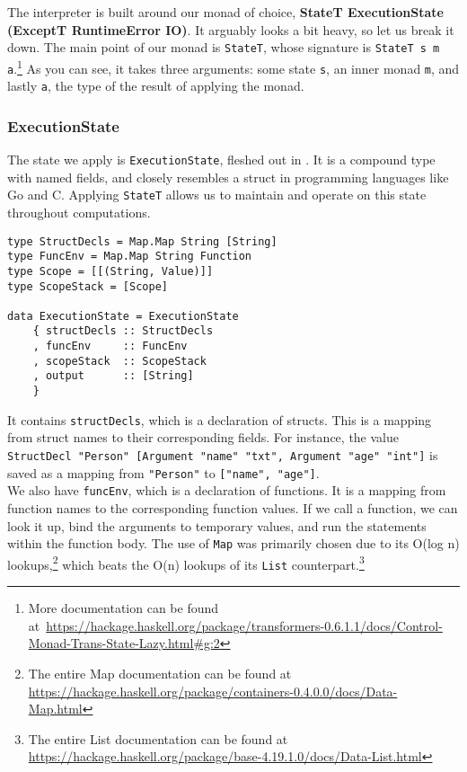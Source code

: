 The interpreter is built around our monad of choice, \textbf{StateT ExecutionState (ExceptT RuntimeError IO)}. It arguably looks a bit heavy, so let us break it down. The main point of our monad is \texttt{StateT}, whose signature is \texttt{StateT s m a}.\footnote{More documentation can be found at~\url{https://hackage.haskell.org/package/transformers-0.6.1.1/docs/Control-Monad-Trans-State-Lazy.html\#g:2}} As you can see, it takes three arguments: some state \texttt{s}, an inner monad \texttt{m}, and lastly \texttt{a}, the type of the result of applying the monad.

\subsubsection{ExecutionState}

The state we apply is \texttt{ExecutionState}, fleshed out in . It is a compound type with named fields, and closely resembles a struct in programming languages like Go and C. Applying \texttt{StateT} allows us to maintain and operate on this state throughout computations. \\

\begin{lstlisting}[caption={The Psnodig interpreter's state.}, captionpos=b, label={psnodigInterpreterState}]
type StructDecls = Map.Map String [String]
type FuncEnv = Map.Map String Function
type Scope = [[(String, Value)]]
type ScopeStack = [Scope]

data ExecutionState = ExecutionState
    { structDecls :: StructDecls
    , funcEnv     :: FuncEnv
    , scopeStack  :: ScopeStack
    , output      :: [String]
    }
\end{lstlisting}

It contains \texttt{structDecls}, which is a declaration of structs. This is a mapping from struct names to their corresponding fields. For instance, the value \texttt{StructDecl "Person" [Argument "name" "txt", Argument "age" "int"]} is saved as a mapping from \texttt{"Person"} to \texttt{["name", "age"]}. \\

We also have \texttt{funcEnv}, which is a declaration of functions. It is a mapping from function names to the corresponding function values. If we call a function, we can look it up, bind the arguments to temporary values, and run the statements within the function body. The use of \texttt{Map} was primarily chosen due to its O(log n) lookups,\footnote{The entire Map documentation can be found at \url{https://hackage.haskell.org/package/containers-0.4.0.0/docs/Data-Map.html}} which beats the O(n) lookups of its \texttt{List} counterpart.\footnote{The entire List documentation can be found at \url{https://hackage.haskell.org/package/base-4.19.1.0/docs/Data-List.html}} \\

